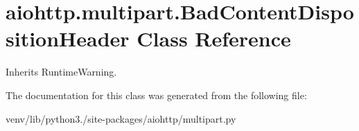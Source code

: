 \hypertarget{classaiohttp_1_1multipart_1_1_bad_content_disposition_header}{}\section{aiohttp.\+multipart.\+Bad\+Content\+Disposition\+Header Class Reference}
\label{classaiohttp_1_1multipart_1_1_bad_content_disposition_header}


Inherits Runtime\+Warning.



The documentation for this class was generated from the following file\+:\begin{DoxyCompactItemize}
\item 
venv/lib/python3./site-\/packages/aiohttp/multipart.\+py\end{DoxyCompactItemize}
